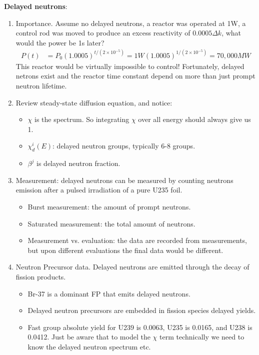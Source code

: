 \documentclass{school-22.211-notes}
\begin{document}
\vspace{0.5cm}
\textbf{Delayed neutrons}:
\begin{enumerate}
\item Importance. Assume no delayed neutrons, a reactor was operated at 1W, a control rod was moved to produce an excess reactivity of $0.0005 \Delta k$, what would the power be 1s later? 
\begin{align}
P(t) &= P_0 (1.0005)^{t/(2\times 10^{-5})} = 1 W (1.0005)^{1/(2\times 10^{-5})} = 70,000 MW 
\end{align}
This reactor would be virtually impossible to control! Fortunately, delayed netrons exist and the reactor time constant depend on more than just prompt neutron lifetime. 

\item Review steady-state diffusion equation, and notice: 
  \begin{itemize}
  \item $\chi$ is the spectrum. So integrating $\chi$ over all energy should always give us 1. 
  \item $\chi_d^i (E)$: delayed neutron groups, typically 6-8 groups. 
  \item $\beta^j$ is delayed neutron fraction. 
  \end{itemize}

\item Measurement: delayed neutrons can be measured by counting neutrons emission after a pulsed irradiation of a pure U235 foil. 
  \begin{itemize}
  \item Burst measurement: the amount of prompt neutrons.
  \item Saturated measurement: the total amount of neutrons. 
  \item Measurement vs. evaluation: the data are recorded from measurements, but upon different evaluations the final data would be different. 
  \end{itemize}

\item Neutron Precursor data. Delayed neutrons are emitted through the decay of fission products. 
  \begin{itemize}
  \item Br-37 is a dominant FP that emits delayed neutrons. 
  \item Delayed neutron precursors are embedded in fission species delayed yields. 
  \item Fast group absolute yield for U239 is 0.0063, U235 is 0.0165, and U238 is 0.0412. Just be aware that to model the $\chi$ term technically we need to know the delayed neutron spectrum etc. 
    \end{itemize}


\end{enumerate}
\end{document}
